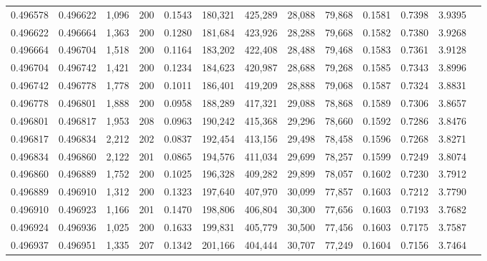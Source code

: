 \begin{tabular}{rrrrrrrrrrrrr}
0.496578 & 0.496622 & 1,096 & 200 &                                     0.1543 & 180,321 & 425,289 &  28,088 &  79,868 & 0.1581 & 0.7398 & 3.9395 \\
0.496622 & 0.496664 & 1,363 & 200 &                                     0.1280 & 181,684 & 423,926 &  28,288 &  79,668 & 0.1582 & 0.7380 & 3.9268 \\
0.496664 & 0.496704 & 1,518 & 200 &                                     0.1164 & 183,202 & 422,408 &  28,488 &  79,468 & 0.1583 & 0.7361 & 3.9128 \\
0.496704 & 0.496742 & 1,421 & 200 &                                     0.1234 & 184,623 & 420,987 &  28,688 &  79,268 & 0.1585 & 0.7343 & 3.8996 \\
0.496742 & 0.496778 & 1,778 & 200 &                                     0.1011 & 186,401 & 419,209 &  28,888 &  79,068 & 0.1587 & 0.7324 & 3.8831 \\
0.496778 & 0.496801 & 1,888 & 200 &                                     0.0958 & 188,289 & 417,321 &  29,088 &  78,868 & 0.1589 & 0.7306 & 3.8657 \\
0.496801 & 0.496817 & 1,953 & 208 &                                     0.0963 & 190,242 & 415,368 &  29,296 &  78,660 & 0.1592 & 0.7286 & 3.8476 \\
0.496817 & 0.496834 & 2,212 & 202 &                                     0.0837 & 192,454 & 413,156 &  29,498 &  78,458 & 0.1596 & 0.7268 & 3.8271 \\
0.496834 & 0.496860 & 2,122 & 201 &                                     0.0865 & 194,576 & 411,034 &  29,699 &  78,257 & 0.1599 & 0.7249 & 3.8074 \\
0.496860 & 0.496889 & 1,752 & 200 &                                     0.1025 & 196,328 & 409,282 &  29,899 &  78,057 & 0.1602 & 0.7230 & 3.7912 \\
0.496889 & 0.496910 & 1,312 & 200 &                                     0.1323 & 197,640 & 407,970 &  30,099 &  77,857 & 0.1603 & 0.7212 & 3.7790 \\
0.496910 & 0.496923 & 1,166 & 201 &                                     0.1470 & 198,806 & 406,804 &  30,300 &  77,656 & 0.1603 & 0.7193 & 3.7682 \\
0.496924 & 0.496936 & 1,025 & 200 &                                     0.1633 & 199,831 & 405,779 &  30,500 &  77,456 & 0.1603 & 0.7175 & 3.7587 \\
0.496937 & 0.496951 & 1,335 & 207 &                                     0.1342 & 201,166 & 404,444 &  30,707 &  77,249 & 0.1604 & 0.7156 & 3.7464 \\

\end{tabular}
